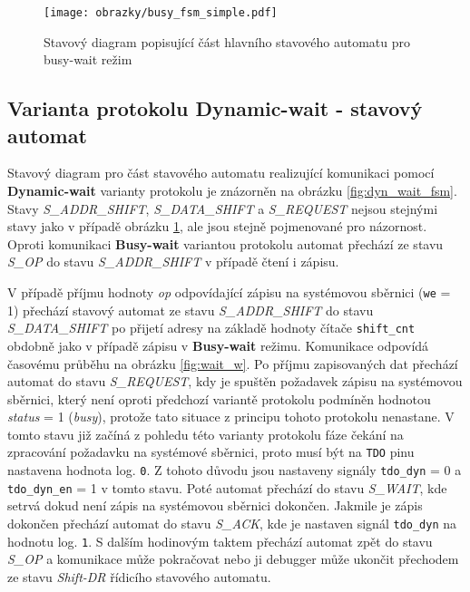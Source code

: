 \begin{figure}[H]
  \begin{center}
    \texttt{[image: obrazky/busy\_fsm\_simple.pdf]}
  \end{center}
  \caption{Stavový diagram popisující část hlavního stavového automatu pro busy-wait režim}
	\label{fig:busy_wait_fsm}
\end{figure}

\subsection{Varianta protokolu Dynamic-wait - stavový automat} \label{subsec:dyn-wait-fsm}
Stavový diagram pro část stavového automatu realizující komunikaci pomocí \textbf{Dynamic-wait} varianty protokolu je znázorněn na obrázku \ref{fig:dyn_wait_fsm}. Stavy \textit{S\_ADDR\_SHIFT}, \textit{S\_DATA\_SHIFT} a \textit{S\_REQUEST} nejsou stejnými stavy jako v případě obrázku \ref{fig:busy_wait_fsm}, ale jsou stejně pojmenované pro názornost. Oproti komunikaci \textbf{Busy-wait} variantou protokolu automat přechází ze stavu \textit{S\_OP} do stavu \textit{S\_ADDR\_SHIFT} v případě čtení i zápisu.

V případě příjmu hodnoty \textit{op} odpovídající zápisu na systémovou sběrnici (\texttt{we} = 1) přechází stavový automat ze stavu \textit{S\_ADDR\_SHIFT} do stavu \textit{S\_DATA\_SHIFT} po přijetí adresy na základě hodnoty čítače \texttt{shift\_cnt} obdobně jako v případě zápisu v \textbf{Busy-wait} režimu. Komunikace odpovídá časovému průběhu na obrázku \ref{fig:wait_w}. Po příjmu zapisovaných dat přechází automat do stavu \textit{S\_REQUEST}, kdy je spuštěn požadavek zápisu na systémovou sběrnici, který není oproti předchozí variantě protokolu podmíněn hodnotou \textit{status} = 1 (\textit{busy}), protože tato situace z principu tohoto protokolu nenastane. V tomto stavu již začíná z pohledu této varianty protokolu fáze čekání na zpracování požadavku na systémové sběrnici, proto musí být na \texttt{\acs{TDO}} pinu nastavena hodnota log. \texttt{0}. Z tohoto důvodu jsou nastaveny signály \texttt{tdo\_dyn} = 0 a \texttt{tdo\_dyn\_en} = 1 v tomto stavu. Poté automat přechází do stavu \textit{S\_WAIT}, kde setrvá dokud není zápis na systémovou sběrnici dokončen. Jakmile je zápis dokončen přechází automat do stavu \textit{S\_ACK}, kde je nastaven signál \texttt{tdo\_dyn} na hodnotu log. \texttt{1}. S dalším hodinovým taktem přechází automat zpět do stavu \textit{S\_OP} a komunikace může pokračovat nebo ji debugger může ukončit přechodem ze stavu \textit{Shift-DR} řídicího stavového automatu.

